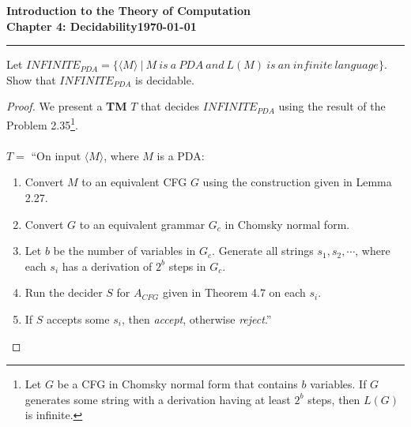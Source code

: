 \documentclass[11pt]{article}
\newcommand{\dated}{\today}
\begin{document}
\textbf{Introduction to the Theory of
Computation}\hfill\textbf{\myname}\\[0.01in]
\textbf{Chapter 4: Decidability}\hfill\textbf{\dated}\\
\smallskip\hrule\bigskip

\begin{problem}{4.11}
Let $INFINITE_{PDA} = \{\langle M \rangle \ | \ M \ is \ a \ PDA \ and \  L(M)\  is \ an \ infinite \ language\}$. Show that $INFINITE_{PDA}$ is decidable.
\end{problem}

\begin{proof}
We present a \textbf{TM} $T$ that decides $INFINITE_{PDA}$ using the result of the Problem 2.35\footnote{Let $G$ be a CFG in Chomsky normal form that contains $b$ variables. If $G$ generates some string with a derivation having at least $2^b$ steps, then $L(G)$ is infinite.}.  \\
\\
$T =$ \textquotedblleft On input $\langle M \rangle$, where $M$ is a PDA:
\begin{enumerate}
\item Convert $M$ to an equivalent CFG $G$ using the construction given in Lemma 2.27.
\item Convert $G$ to an equivalent grammar $G_c$ in Chomsky normal form.
\item Let $b$ be the number of variables in $G_c$. Generate all strings $s_1, s_2, \cdots$, where each $s_i$ has a derivation of $2^b$ steps in $G_c$.
\item Run the decider $S$ for $A_{CFG}$ given in Theorem 4.7 on each $s_i$.
\item If $S$ accepts some $s_i$, then \textit{accept}, otherwise \textit{reject}.\textquotedblright
\end{enumerate}
\end{proof}
\end{document}
